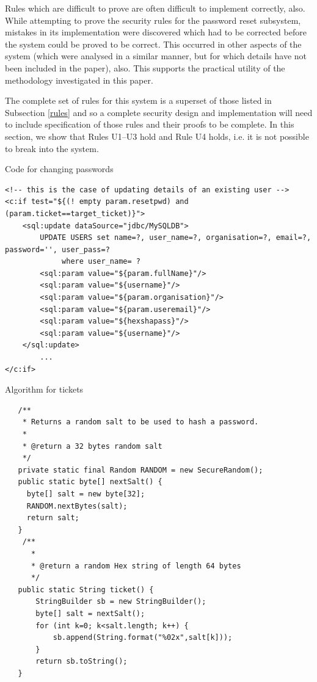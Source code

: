 Rules which are difficult to prove are often difficult to implement correctly, also.
While attempting to prove the security rules for the password reset subsystem, mistakes
in its implementation were discovered which had to be corrected before the system could be
proved to be correct. This occurred in other aspects of the system (which were
analysed in a similar manner, but for which details have not been included
in the paper), also. This supports the practical utility of the methodology 
investigated in this paper.

The complete set of rules for this system is a superset of those listed in Subsection \ref{rules}
and so a complete security design and implementation will need to include
specification of those rules and their proofs to be complete. 
In this section, we show that Rules U1--U3 hold and
Rule U4 holds, i.e. it is not possible to break into the system.

\begin{listing}
\caption{Code for changing passwords}\label{ticketcode}
{\footnotesize
\begin{verbatim}
<!-- this is the case of updating details of an existing user -->
<c:if test="${(! empty param.resetpwd) and (param.ticket==target_ticket)}">
    <sql:update dataSource="jdbc/MySQLDB">
        UPDATE USERS set name=?, user_name=?, organisation=?, email=?, password='', user_pass=?
             where user_name= ?
        <sql:param value="${param.fullName}"/>
        <sql:param value="${username}"/>
        <sql:param value="${param.organisation}"/>
        <sql:param value="${param.useremail}"/>
        <sql:param value="${hexshapass}"/>
        <sql:param value="${username}"/>
    </sql:update>
		... 
</c:if>
\end{verbatim}
}
\end{listing}
    
\begin{listing}
\caption{Algorithm for tickets}\label{ticketalg}
{\footnotesize
\vspace{5mm}
\begin{verbatim}
   /**
    * Returns a random salt to be used to hash a password.
    *
    * @return a 32 bytes random salt
    */
   private static final Random RANDOM = new SecureRandom();
   public static byte[] nextSalt() {
     byte[] salt = new byte[32];
     RANDOM.nextBytes(salt);
     return salt;
   }
    /**
      *
      * @return a random Hex string of length 64 bytes
      */
   public static String ticket() {
       StringBuilder sb = new StringBuilder();
       byte[] salt = nextSalt();
       for (int k=0; k<salt.length; k++) {
           sb.append(String.format("%02x",salt[k]));
       }
       return sb.toString();
   }
\end{verbatim}
}
\end{listing}

